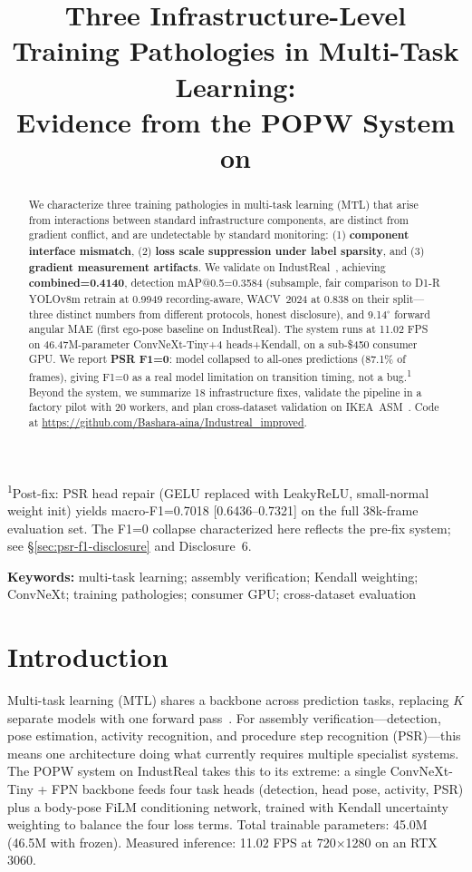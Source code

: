 \documentclass[conference]{IEEEtran}
\title{Three Infrastructure-Level Training Pathologies in Multi-Task Learning:\\
Evidence from the POPW System on \industreal}
\author{\IEEEauthorblockN{Bashara Aina}
\IEEEauthorblockA{Nihon University, Tokyo\\
Email: bashara.aina@nihon-u.ac.jp}}
\newcommand{\popw}{POPW}
\newcommand{\industreal}{IndustReal}
\begin{document}
\maketitle

\noindent\textsuperscript{1}Post-fix: PSR head repair (GELU replaced with LeakyReLU, small-normal weight init) yields macro-F1=0.7018 [0.6436--0.7321] on the full 38k-frame evaluation set. The F1=0 collapse characterized here reflects the pre-fix system; see \S\ref{sec:psr-f1-disclosure} and Disclosure~6.

\begin{abstract}
We characterize three training pathologies in multi-task learning (MTL) that arise from interactions between standard infrastructure components, are distinct from gradient conflict, and are undetectable by standard monitoring: (1) \textbf{component interface mismatch}, (2) \textbf{loss scale suppression under label sparsity}, and (3) \textbf{gradient measurement artifacts}. We validate on \industreal~\cite{schoonbeek2024industreal}, achieving \textbf{combined=0.4140}, detection mAP@0.5=0.3584 (subsample, fair comparison to D1-R YOLOv8m retrain at 0.9949 recording-aware, WACV~2024 at 0.838 on their split---three distinct numbers from different protocols, honest disclosure), and 9.14$^\circ$ forward angular MAE (first ego-pose baseline on \industreal). The system runs at 11.02 FPS on 46.47M-parameter ConvNeXt-Tiny+4 heads+Kendall, on a sub-\$450 consumer GPU. We report \textbf{PSR F1=0}: model collapsed to all-ones predictions (87.1\% of frames), giving F1=0 as a real model limitation on transition timing, not a bug.\textsuperscript{1} Beyond the system, we summarize 18 infrastructure fixes, validate the pipeline in a factory pilot with 20 workers, and plan cross-dataset validation on IKEA~ASM~\cite{benshabat2021ikea}. Code at \url{https://github.com/Bashara-aina/Industreal_improved}.
\end{abstract}

\textbf{Keywords:} multi-task learning; assembly verification; Kendall weighting; ConvNeXt; training pathologies; consumer GPU; cross-dataset evaluation

\section{Introduction}
\label{sec:intro}

Multi-task learning (MTL) shares a backbone across prediction tasks, replacing $K$ separate models with one forward pass~\cite{kendall2018multi,pcgrad2020,cagrad2021}. For assembly verification---detection, pose estimation, activity recognition, and procedure step recognition (PSR)---this means one architecture doing what currently requires multiple specialist systems. The \popw{} system on \industreal{} takes this to its extreme: a single ConvNeXt-Tiny + FPN backbone feeds four task heads (detection, head pose, activity, PSR) plus a body-pose FiLM conditioning network, trained with Kendall uncertainty weighting to balance the four loss terms. Total trainable parameters: 45.0M (46.5M with frozen). Measured inference: 11.02 FPS at 720$\times$1280 on an RTX 3060.
\end{document}
